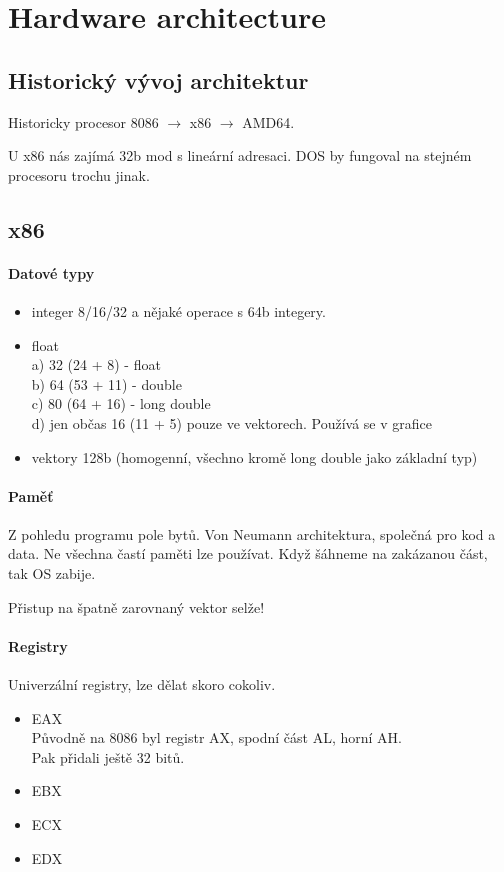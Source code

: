 \section{\texorpdfstring{Hardware architecture}{Hardware architecture}}
\vspace{5mm}
\large

\subsection{Historický vývoj architektur}
Historicky procesor 8086 $\to$ x86 $\to$ AMD64.

U x86 nás zajímá 32b mod s lineární adresaci.
DOS by fungoval na stejném procesoru trochu jinak.

\subsection{x86}

\paragraph{Datové typy}
\begin{itemize}
	\item integer 8/16/32 a nějaké operace s 64b integery.
	\item float\\
		a) 32 (24 + 8) - float\\
		b) 64 (53 + 11) - double\\
		c) 80 (64 + 16) - long double\\
		d) jen občas 16 (11 + 5) pouze ve vektorech.
		Používá se v grafice
	\item vektory 128b (homogenní, všechno kromě long double jako základní typ)
\end{itemize}

\paragraph{Paměť}
Z pohledu programu pole bytů. Von Neumann architektura, společná pro kod a data.
Ne všechna častí paměti lze používat. Když šáhneme na zakázanou část, tak OS zabije.

Přistup na špatně zarovnaný vektor selže!

\paragraph{Registry}
Univerzální registry, lze dělat skoro cokoliv.
\begin{itemize}
	\item EAX\\
		Původně na 8086 byl registr AX, spodní část AL, horní AH.\\
		Pak přidali ještě 32 bitů.
	\item EBX
	\item ECX
	\item EDX
\end{itemize}

